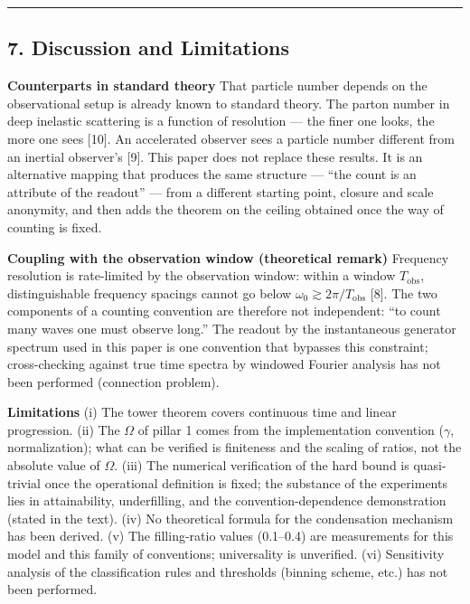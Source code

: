 \documentclass[
  a4paper,
]{article}
\begin{document}
\begin{center}\rule{0.5\linewidth}{0.5pt}\end{center}

\subsection{7. Discussion and
Limitations}\label{discussion-and-limitations}

\textbf{Counterparts in standard theory} That particle number depends on
the observational setup is already known to standard theory. The parton
number in deep inelastic scattering is a function of resolution --- the
finer one looks, the more one sees {[}10{]}. An accelerated observer
sees a particle number different from an inertial observer's {[}9{]}.
This paper does not replace these results. It is an alternative mapping
that produces the same structure --- ``the count is an attribute of the
readout'' --- from a different starting point, closure and scale
anonymity, and then adds the theorem on the ceiling obtained once the
way of counting is fixed.

\textbf{Coupling with the observation window (theoretical remark)}
Frequency resolution is rate-limited by the observation window: within a
window \(T_{\mathrm{obs}}\), distinguishable frequency spacings cannot
go below \(\omega_0\gtrsim2\pi/T_{\mathrm{obs}}\) {[}8{]}. The two
components of a counting convention are therefore not independent: ``to
count many waves one must observe long.'' The readout by the
instantaneous generator spectrum used in this paper is one convention
that bypasses this constraint; cross-checking against true time spectra
by windowed Fourier analysis has not been performed (connection
problem).

\textbf{Limitations} (i) The tower theorem covers continuous time and
linear progression. (ii) The \(\Omega\) of pillar 1 comes from the
implementation convention (\(\gamma\), normalization); what can be
verified is finiteness and the scaling of ratios, not the absolute value
of \(\Omega\). (iii) The numerical verification of the hard bound is
quasi-trivial once the operational definition is fixed; the substance of
the experiments lies in attainability, underfilling, and the
convention-dependence demonstration (stated in the text). (iv) No
theoretical formula for the condensation mechanism has been derived. (v)
The filling-ratio values (0.1--0.4) are measurements for this model and
this family of conventions; universality is unverified. (vi) Sensitivity
analysis of the classification rules and thresholds (binning scheme,
etc.) has not been performed.
\end{document}
